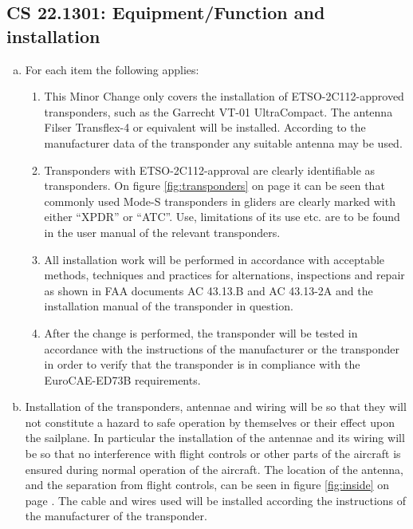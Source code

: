 \documentclass{article}
\begin{document}
\subsection[CS 22.1301]{CS 22.1301:  Equipment/Function and installation}
\begin{enumerate}[(a)]
\item For each item the following applies:
\begin{enumerate}[(1)]
\item This Minor Change only covers the installation of ETSO-2C112-approved transponders, such as the Garrecht VT-01 UltraCompact. The antenna Filser Transflex-4 or equivalent will be installed. According to the manufacturer data of the transponder any suitable antenna may be used.
\item Transponders with ETSO-2C112-approval are clearly identifiable as transponders. On figure \ref{fig:transponders} on page \pageref{fig:transponders} it can be seen that commonly used Mode-S transponders in gliders are clearly marked with either ``XPDR'' or ``ATC''. Use, limitations of its use etc. are to be found in the user manual of the relevant transponders.
\item All installation work will be performed in accordance with acceptable methods, techniques and practices for alternations, inspections and repair as shown in FAA documents AC 43.13.B and AC 43.13-2A and the installation manual of the transponder in question.
\item After the change is performed, the transponder will be tested in accordance with the instructions of the manufacturer or the transponder in order to verify that the transponder is in compliance with the EuroCAE-ED73B requirements.
\end{enumerate}
\item Installation of the transponders, antennae and wiring will be so that they will not constitute a hazard to safe operation by themselves or their effect upon the sailplane. In particular the installation of the antennae and its wiring will be so that no interference with flight controls or other parts of the aircraft is ensured during normal operation of the aircraft. The location of the antenna, and the separation from flight controls, can be seen in figure \ref{fig:inside} on page \pageref{fig:inside}. The cable and wires used will be installed according the instructions of the manufacturer of the transponder.
\end{enumerate}
\end{document}
